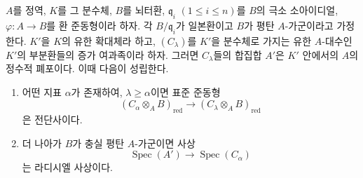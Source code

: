 \begin{proposition}[23.2.4]
\label{0.23.2.4-ko}
$A$를 정역, $K$를 그 분수체, $B$를 뇌터환,
$\mathfrak q_i$ $(1\leq i\leq n)$를 $B$의 극소 소아이디얼,
$\varphi:A\to B$를 환 준동형이라 하자. 각
$B/\mathfrak q_i$가 일본환이고 $B$가 평탄 $A$-가군이라고
가정한다. $K'$을 $K$의 유한 확대체라 하고, $(C_\lambda)$를
$K'$을 분수체로 가지는 유한 $A$-대수인 $K'$의 부분환들의 증가
여과족이라 하자. 그러면 $C_\lambda$들의 합집합 $A'$은 $K'$ 안에서의
$A$의 정수적 폐포이다. 이때 다음이 성립한다.
\begin{enumerate}
  \item[(i)] 어떤 지표 $\alpha$가 존재하여, $\lambda\geq\alpha$이면
  표준 준동형
  \begin{equation}
  \label{0.23.2.4.1-ko}
    (C_\alpha\otimes_AB)_{\mathrm{red}}
    \longrightarrow(C_\lambda\otimes_AB)_{\mathrm{red}}
    \tag{23.2.4.1}
  \end{equation}
  은 전단사이다.
  \item[(ii)] 더 나아가 $B$가 충실 평탄 $A$-가군이면 사상
  \[
    \operatorname{Spec}(A')\longrightarrow
    \operatorname{Spec}(C_\alpha)
  \]
  는 라디시엘 사상이다.
\end{enumerate}
\end{proposition}

